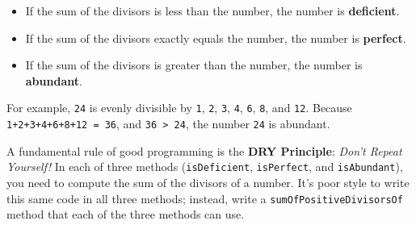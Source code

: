 \documentclass[12pt,a4paper,times]{article}
\begin{document}
\begin{itemize}
\item
  If the sum of the divisors is less than the number, the number is
  \textbf{deficient}.
\item
  If the sum of the divisors exactly equals the number, the number is
  \textbf{perfect}.
\item
  If the sum of the divisors is greater than the number, the number is
  \textbf{abundant}.
\end{itemize}
For example, \texttt{24} is evenly divisible by \texttt{1}, \texttt{2},
\texttt{3}, \texttt{4}, \texttt{6}, \texttt{8}, and \texttt{12}. Because
\texttt{1+2+3+4+6+8+12\ =\ 36}, and \texttt{36\ \textgreater{}\ 24}, the
number \texttt{24} is abundant.

A fundamental rule of good programming is the \textbf{DRY Principle}:
\emph{Don't Repeat Yourself!} In each of three methods
(\texttt{isDeficient}, \texttt{isPerfect}, and \texttt{isAbundant}), you
need to compute the sum of the divisors of a number. It's poor style to
write this same code in all three methods; instead, write a
\texttt{sumOfPositiveDivisorsOf} method that each of the three methods
can use.
\end{document}
